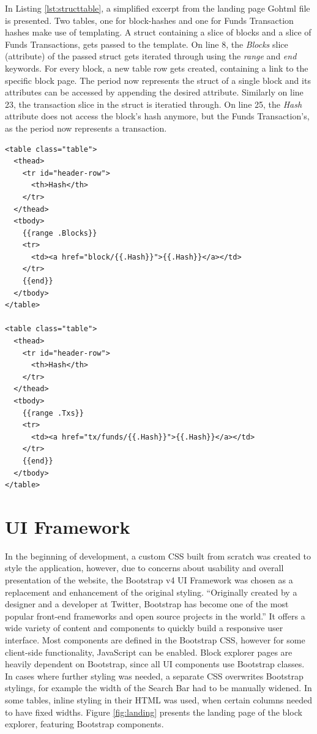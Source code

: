 In Listing \ref{lst:structtable}, a simplified excerpt from the landing page Gohtml file is presented. Two tables, one for block-hashes and one for Funds Transaction hashes make use of templating. A struct containing a slice of blocks and a slice of Funds Transactions, gets passed to the template. On line 8, the \emph{Blocks} slice (attribute) of the passed struct gets iterated through using the \emph{range} and \emph{end} keywords. For every block, a new table row gets created, containing a link to the specific block page. The period now represents the struct of a single block and its attributes can be accessed by appending the desired attribute. Similarly on line 23, the transaction slice in the struct is iteratied through. On line 25, the \emph{Hash} attribute does not access the block's hash anymore, but the Funds Transaction's, as the period now represents a transaction.
\newpage
\begin{lstlisting}[caption={Block and Funds Transaction Tables Accessing a \emph{blocksandtx} Struct},captionpos=b,label={lst:structtable}]
<table class="table">
  <thead>
    <tr id="header-row">
      <th>Hash</th>
    </tr>
  </thead>
  <tbody>
    {{range .Blocks}}
    <tr>
      <td><a href="block/{{.Hash}}">{{.Hash}}</a></td>
    </tr>
    {{end}}
  </tbody>
</table>

<table class="table">
  <thead>
    <tr id="header-row">
      <th>Hash</th>
    </tr>
  </thead>
  <tbody>
    {{range .Txs}}
    <tr>
      <td><a href="tx/funds/{{.Hash}}">{{.Hash}}</a></td>
    </tr>
    {{end}}
  </tbody>
</table>
\end{lstlisting}

\section{UI Framework} \label{sec:uiframeworks}
In the beginning of development, a custom CSS built from scratch was created to style the application, however, due to concerns about usability and overall presentation of the website, the Bootstrap v4 UI Framework \cite{bootstrap} was chosen as a replacement and enhancement of the original styling.
``Originally created by a designer and a developer at Twitter, Bootstrap has become one of the most popular front-end frameworks and open source projects in the world.'' \cite{bootstraphistory}
It offers a wide variety of content and components to quickly build a responsive user interface. Most components are defined in the Bootstrap CSS, however for some client-side functionality, JavaScript can be enabled. Block explorer pages are heavily dependent on Bootstrap, since all UI components use Bootstrap classes. In cases where further styling was needed, a separate CSS overwrites Bootstrap stylings, for example the width of the Search Bar had to be manually widened. In some tables, inline styling in their HTML was used, when certain columns needed to have fixed widths. Figure \ref{fig:landing} presents the landing page of the block explorer, featuring Bootstrap components.

